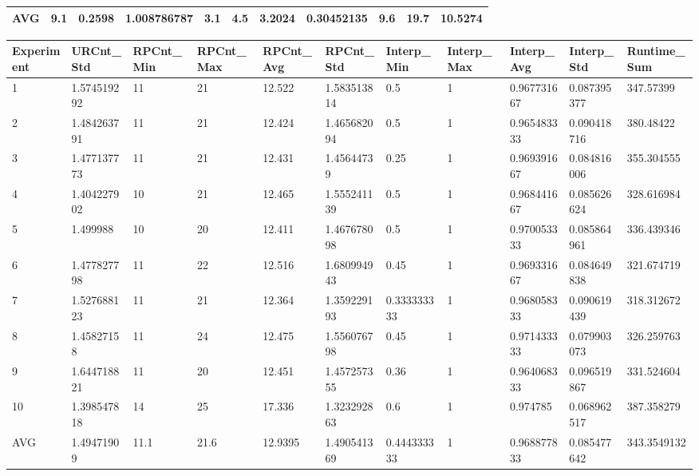 \begin{table}[H]
\begin{adjustbox}{max width=380pt,keepaspectratio,angle=90}
\begin{tabular}{|l|l|l|l|l|l|l|l|l|l|l|}
						AVG        & 9.1       & 0.2598    & 1.008786787 & 3.1          & 4.5          & 3.2024       & 0.30452135   & 9.6        & 19.7       & 10.5274    \\ \hline
					\end{tabular}	
				\end{adjustbox}
				\begin{adjustbox}{max width=380pt,keepaspectratio,angle=90}
					\begin{tabular}{|l|l|l|l|l|l|l|l|l|l|l|}
						\rowcolor[HTML]{EFEFEF} 
						\hline
						Experiment & URCnt\_Std  & RPCnt\_Min & RPCnt\_Max & RPCnt\_Avg & RPCnt\_Std  & Interp\_Min & Interp\_Max & Interp\_Avg & Interp\_Std & Runtime\_Sum \\ \hline
						1          & 1.574519292 & 11         & 21         & 12.522     & 1.583513814 & 0.5         & 1           & 0.967731667 & 0.087395377 & 347.57399    \\ \hline
						2          & 1.484263791 & 11         & 21         & 12.424     & 1.465682094 & 0.5         & 1           & 0.965483333 & 0.090418716 & 380.48422    \\ \hline
						3          & 1.477137773 & 11         & 21         & 12.431     & 1.45644739  & 0.25        & 1           & 0.969391667 & 0.084816006 & 355.304555   \\ \hline
						4          & 1.404227902 & 10         & 21         & 12.465     & 1.555241139 & 0.5         & 1           & 0.968441667 & 0.085626624 & 328.616984   \\ \hline
						5          & 1.499988    & 10         & 20         & 12.411     & 1.467678098 & 0.5         & 1           & 0.970053333 & 0.085864961 & 336.439346   \\ \hline
						6          & 1.477827798 & 11         & 22         & 12.516     & 1.680994943 & 0.45        & 1           & 0.969331667 & 0.084649838 & 321.674719   \\ \hline
						7          & 1.527688123 & 11         & 21         & 12.364     & 1.359229193 & 0.333333333 & 1           & 0.968058333 & 0.090619439 & 318.312672   \\ \hline
						8          & 1.45827158  & 11         & 24         & 12.475     & 1.556076798 & 0.45        & 1           & 0.971433333 & 0.079903073 & 326.259763   \\ \hline
						9          & 1.644718821 & 11         & 20         & 12.451     & 1.457257355 & 0.36        & 1           & 0.964068333 & 0.096519867 & 331.524604   \\ \hline
						10         & 1.398547818 & 14         & 25         & 17.336     & 1.323292863 & 0.6         & 1           & 0.974785    & 0.068962517 & 387.358279   \\ \hline\hline
						AVG        & 1.49471909  & 11.1       & 21.6       & 12.9395    & 1.490541369 & 0.444333333 & 1           & 0.968877833 & 0.085477642 & 343.3549132  \\ \hline
					\end{tabular}
				\end{adjustbox}	
			\end{table}
		
